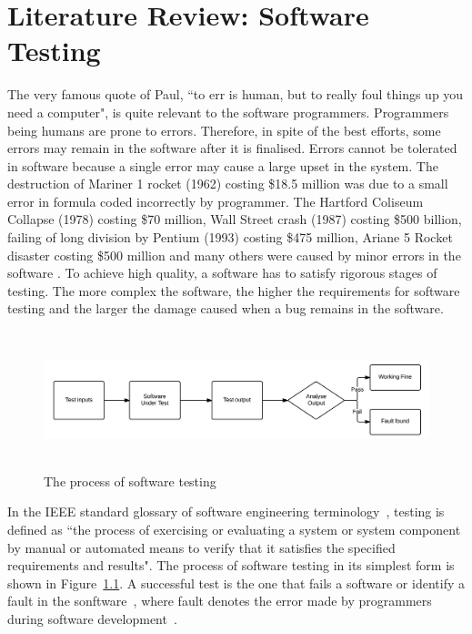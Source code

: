 \chapter{Literature Review: Software Testing}
\label{chap:softwareTesting}
The very famous quote of Paul, ``to err is human, but to really foul things up you need a computer", is quite relevant to the software programmers. Programmers being humans are prone to errors. Therefore, in spite of the best efforts, some errors may remain in the software after it is finalised.  Errors cannot be tolerated in software because a single error may cause a large upset in the system. The destruction of Mariner 1 rocket (1962) costing \$18.5 million was due to a small error in formula coded incorrectly by programmer. The Hartford Coliseum Collapse (1978) costing \$70 million, Wall Street crash (1987) costing \$500 billion, failing of long division by Pentium (1993) costing \$475 million, Ariane 5 Rocket disaster costing \$500 million and many others were caused by minor errors in the software \cite{toweysoftware}. To achieve high quality, a software has to satisfy rigorous stages of testing. The more complex the software, the higher the requirements for software testing and the larger the damage caused when a bug remains in the software.

\begin{figure}[h]
	\centering
	\includegraphics[width=15.5cm, height=4cm]{chapter2/softwareTesting.png}
	\caption{The process of software testing}
	\label{fig:softwareTesting}
\end{figure}

In the IEEE standard glossary of software engineering terminology~\cite{american1984}, testing is defined as ``the process of exercising or evaluating a system or system component by manual or automated means to verify that it satisfies the specified requirements and results". The process of software testing in its simplest form is shown in Figure~\ref{fig:softwareTesting}. A successful test is the one that fails a software or identify a fault in the sonftware~\cite{Myers1979}, where fault denotes the error made by programmers during software development~\cite{american1984}.

